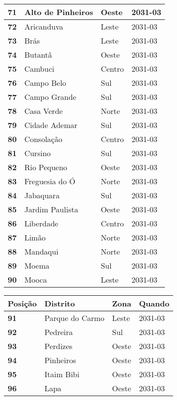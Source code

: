\begin{table}[H]
\begin{tabular}{l|l|l|l}
		\textbf{71} & Alto de Pinheiros & Oeste & 2031-03\\ \hline
		\textbf{72} & Aricanduva & Leste & 2031-03\\ \hline
		\textbf{73} & Brás & Leste & 2031-03\\ \hline
		\textbf{74} & Butantã & Oeste & 2031-03\\ \hline
		\textbf{75} & Cambuci & Centro & 2031-03\\ \hline
		\textbf{76} & Campo Belo & Sul & 2031-03\\ \hline
		\textbf{77} & Campo Grande & Sul & 2031-03\\ \hline
		\textbf{78} & Casa Verde & Norte & 2031-03\\ \hline
		\textbf{79} & Cidade Ademar & Sul & 2031-03\\ \hline
		\textbf{80} & Consolação & Centro & 2031-03\\ \hline
		\textbf{81} & Cursino & Sul & 2031-03\\ \hline
		\textbf{82} & Rio Pequeno & Oeste & 2031-03\\ \hline
		\textbf{83} & Freguesia do Ó & Norte & 2031-03\\ \hline
		\textbf{84} & Jabaquara & Sul & 2031-03\\ \hline
		\textbf{85} & Jardim Paulista & Oeste & 2031-03\\ \hline
		\textbf{86} & Liberdade & Centro & 2031-03\\ \hline
		\textbf{87} & Limão & Norte & 2031-03\\ \hline
		\textbf{88} & Mandaqui & Norte & 2031-03\\ \hline
		\textbf{89} & Moema & Sul & 2031-03\\ \hline
		\textbf{90} & Mooca & Leste & 2031-03\\ 
	\end{tabular}
\end{table}

\begin{table}[H]
	\centering
	\begin{tabular}{l|l|l|l}
		\textbf{Posição} & \textbf{Distrito} & \textbf{Zona} & \textbf{Quando} \\ \hline
			\textbf{91} & Parque do Carmo & Leste & 2031-03\\ \hline
			\textbf{92} & Pedreira & Sul & 2031-03\\ \hline
			\textbf{93} & Perdizes & Oeste & 2031-03\\ \hline
			\textbf{94} & Pinheiros & Oeste & 2031-03\\ \hline
			\textbf{95} & Itaim Bibi & Oeste & 2031-03\\ \hline
			\textbf{96} & Lapa & Oeste & 2031-03\\ 	
	\end{tabular}
\end{table}

